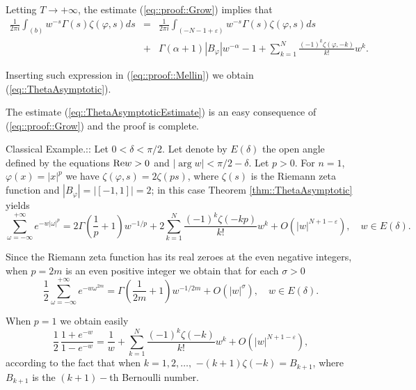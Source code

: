\documentclass[12pt,a4paper]{amsart}
\begin{document}
{Letting ${T}\to+\infty$,
the estimate (\ref{eq::proof::Grow}) implies that
\begin{eqnarray}\nonumber
	\frac{1}{2\pi i}\int_{({b})}
		{w}^{-{s}}\Gamma({s})
		{\zeta}({\varphi},{s})d{s}
	&=&
	\frac{1}{2\pi i}\int_{(-N-1+{\varepsilon})}
		{w}^{-{s}}\Gamma({s})
		{\zeta}({\varphi},{s})d{s}
\\
\nonumber
	&+&\Gamma({\alpha}+1){\left|{{B}_{\varphi}}\right|}{w}^{-{\alpha}}
	-1+
	\sum_{{k}=1}^{N}
		\frac{(-1)^{k}{\zeta}({\varphi},-{k})}{{k}!}{w}^{k}.
\end{eqnarray}

Inserting such expression in (\ref{eq::proof::Mellin})
we obtain (\ref{eq::ThetaAsymptotic}).

The estimate (\ref{eq::ThetaAsymptoticEstimate})
is an easy consequence of
(\ref{eq::proof::Grow})
and the proof is complete.

\rem Classical Example.::
Let $0<{\delta}<\pi/2$.
Let denote by ${E}({\delta})$ the open angle
defined by the equations
${\mathop{\rm Re}\nolimits}{w}>0$ and ${\left|{\arg{w}}\right|}<\pi/2-{\delta}$.
Let ${p}>0$.
For ${n}=1$, ${\varphi}({x})={\left|{x}\right|}^{p}$ we have
${\zeta}({\varphi},{s})=2{\zeta}({p}{s})$,
where ${\zeta}({s})$ is the Riemann zeta function
and ${\left|{{B}_{\varphi}}\right|}={\left|{[-1,1]}\right|}=2$;
in this case Theorem \ref{thm::ThetaAsymptotic} yields
\begin{equation}\nonumber
\sum_{{\omega}=-\infty}^{+\infty}
	e^{-{w}{\left|{\omega}\right|}^{p}}=
2\Gamma\left(\frac{1}{p}+1\right){w}^{-1/{p}}+
2\sum_{{k}=1}^{N}
	\frac{(-1)^{k}{\zeta}(-{k}{p})}{{k}!}{w}^{k}+
O({\left|{w}\right|}^{{N}+1-{\varepsilon}}),
\quad{w}\in{E}({\delta}).
\end{equation}

Since the Riemann zeta function has its real zeroes
at the even negative integers,
when ${p}=2m$ is an even positive integer
we obtain that for each ${\sigma}>0$
\begin{equation}\nonumber
\frac{1}{2}
\sum_{{\omega}=-\infty}^{+\infty}
	e^{-{w}{\omega}^{2m}}=
\Gamma\left(\frac{1}{2m}+1\right){w}^{-1/{2m}}+
O({\left|{w}\right|}^{\sigma}),
\quad{w}\in{E}({\delta}).
\end{equation}

When ${p}=1$ we obtain easily
\begin{equation}\nonumber
\frac{1}{2}\,\frac{1+e^{-{w}}}{1-e^{-{w}}}=
\frac{1}{w}+
\sum_{{k}=1}^{N}
	\frac{(-1)^{k}{\zeta}(-{k})}{{k}!}{w}^{k}+
O({\left|{w}\right|}^{{N}+1-{\varepsilon}}),
\end{equation}
according to the fact that when ${k}=1,2,\ldots,$ 
$-({k}+1){\zeta}(-{k})=B_{{k}+1}$,
where $B_{{k}+1}$ is the $({k}+1)-$th Bernoulli number.

}
\end{document}
